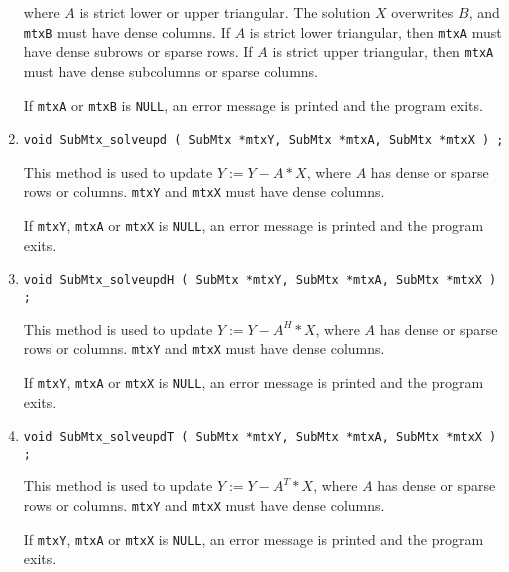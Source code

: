 \begin{enumerate}
where $A$ is strict lower or upper triangular.
The solution $X$ overwrites $B$, and {\tt mtxB} must have dense
columns.
If $A$ is strict lower triangular, then {\tt mtxA} must have dense
subrows or sparse rows.
If $A$ is strict upper triangular, then {\tt mtxA} must have dense
subcolumns or sparse columns.
\par {}
If {\tt mtxA} or {\tt mtxB} is {\tt NULL},
an error message is printed and the program exits.
\item
\begin{verbatim}
void SubMtx_solveupd ( SubMtx *mtxY, SubMtx *mtxA, SubMtx *mtxX ) ;
\end{verbatim}
This method is used to update $Y := Y - A * X$,
where $A$ has dense or sparse rows or columns.
{\tt mtxY} and {\tt mtxX} must have dense columns.
\par {}
If {\tt mtxY}, {\tt mtxA} or {\tt mtxX} is {\tt NULL},
an error message is printed and the program exits.
\item
\begin{verbatim}
void SubMtx_solveupdH ( SubMtx *mtxY, SubMtx *mtxA, SubMtx *mtxX ) ;
\end{verbatim}
This method is used to update $Y := Y - A^H * X$,
where $A$ has dense or sparse rows or columns.
{\tt mtxY} and {\tt mtxX} must have dense columns.
\par {}
If {\tt mtxY}, {\tt mtxA} or {\tt mtxX} is {\tt NULL},
an error message is printed and the program exits.
\item
\begin{verbatim}
void SubMtx_solveupdT ( SubMtx *mtxY, SubMtx *mtxA, SubMtx *mtxX ) ;
\end{verbatim}
This method is used to update $Y := Y - A^T * X$,
where $A$ has dense or sparse rows or columns.
{\tt mtxY} and {\tt mtxX} must have dense columns.
\par {}
If {\tt mtxY}, {\tt mtxA} or {\tt mtxX} is {\tt NULL},
an error message is printed and the program exits.
\end{enumerate}
\par
